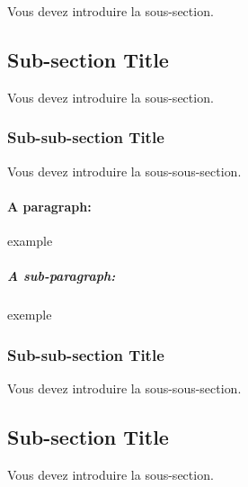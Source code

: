 Vous devez introduire la  sous-section.

\subsection{Sub-section Title}

Vous devez introduire la  sous-section.

\subsubsection{Sub-sub-section Title}

Vous devez introduire la  sous-sous-section.

\paragraph{A paragraph:} example

\subparagraph{A sub-paragraph:} exemple

\subsubsection{Sub-sub-section Title}

Vous devez introduire la  sous-sous-section.

\subsection{Sub-section Title}

Vous devez introduire la  sous-section.
